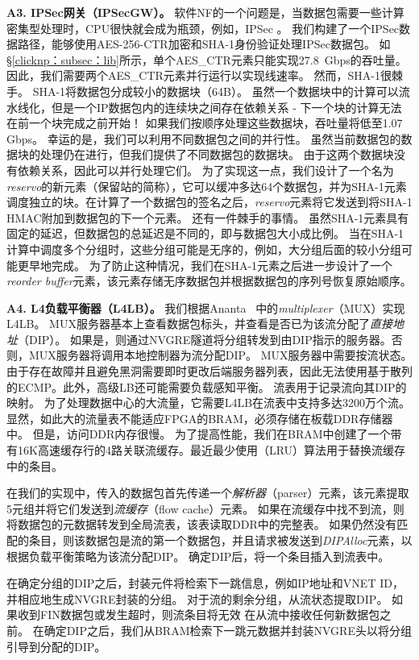 \textbf{A3. IPSec网关（IPSecGW）。}
软件NF的一个问题是，当数据包需要一些计算密集型处理时，CPU很快就会成为瓶颈，例如，IPSec \cite {packetshader}。
我们构建了一个IPSec数据路径，能够使用AES-256-CTR加密和SHA-1身份验证处理IPSec数据包。
如\S \ref {clicknp：subsec：lib}所示，单个AES\_CTR元素只能实现27.8~Gbps的吞吐量。因此，我们需要两个AES\_CTR元素并行运行以实现线速率。
然而，SHA-1很棘手。 SHA-1将数据包分成较小的数据块（64B）。
虽然一个数据块中的计算可以流水线化，但是一个IP数据包内的连续块之间存在依赖关系 - 下一个块的计算无法在前一个块完成之前开始！
如果我们按顺序处理这些数据块，吞吐量将低至1.07 Gbps。
幸运的是，我们可以利用不同数据包之间的并行性。
虽然当前数据包的数据块的处理仍在进行，但我们提供了不同数据包的数据块。
由于这两个数据块没有依赖关系，因此可以并行处理它们。
为了实现这一点，我们设计了一个名为\textit {reservo}的新元素（保留站的简称），它可以缓冲多达64个数据包，并为SHA-1元素调度独立的块。在计算了一个数据包的签名之后，\textit {reservo}元素将它发送到将SHA-1 HMAC附加到数据包的下一个元素。
还有一件棘手的事情。
虽然SHA-1元素具有固定的延迟，但数据包的总延迟是不同的，即与数据包大小成比例。
当在SHA-1计算中调度多个分组时，这些分组可能是无序的，例如，大分组后面的较小分组可能更早地完成。
为了防止这种情况，我们在SHA-1元素之后进一步设计了一个\textit {reorder buffer}元素，该元素存储无序数据包并根据数据包的序列号恢复原始顺序。

\textbf {A4. L4负载平衡器（L4LB）。}
我们根据Ananta~ \cite {ananta}中的\textit {multiplexer}（MUX）实现L4LB。
MUX服务器基本上查看数据包标头，并查看是否已为该流分配了\textit {直接地址}（DIP）。
如果是，则通过NVGRE隧道将分组转发到由DIP指示的服务器。否则，MUX服务器将调用本地控制器为流分配DIP。
MUX服务器中需要按流状态。
由于存在故障并且避免黑洞需要即时更改后端服务器列表，因此无法使用基于散列的ECMP。此外，高级LB还可能需要负载感知平衡。
流表用于记录流向其DIP的映射。
为了处理数据中心的大流量，它需要L4LB在流表中支持多达3200万个流。
显然，如此大的流量表不能适应FPGA的BRAM，必须存储在板载DDR存储器中。
但是，访问DDR内存很慢。
为了提高性能，我们在BRAM中创建了一个带有16K高速缓存行的4路关联流缓存。最近最少使用（LRU）算法用于替换流缓存中的条目。

在我们的实现中，传入的数据包首先传递一个\textit {解析器}（parser）元素，该元素提取5元组并将它们发送到\textit {流缓存}（flow cache）元素。
如果在流缓存中找不到流，则将数据包的元数据转发到全局流表，该表读取DDR中的完整表。
如果仍然没有匹配的条目，则该数据包是流的第一个数据包，并且请求被发送到\textit {DIPAlloc}元素，以根据负载平衡策略为该流分配DIP。
确定DIP后，将一个条目插入到流表中。

在确定分组的DIP之后，封装元件将检索下一跳信息，例如IP地址和VNET ID，并相应地生成NVGRE封装的分组。
对于流的剩余分组，从流状态提取DIP。
如果收到FIN数据包或发生超时，则流条目将无效
在从流中接收任何新数据包之前。
在确定DIP之后，我们从BRAM检索下一跳元数据并封装NVGRE头以将分组引导到分配的DIP。

